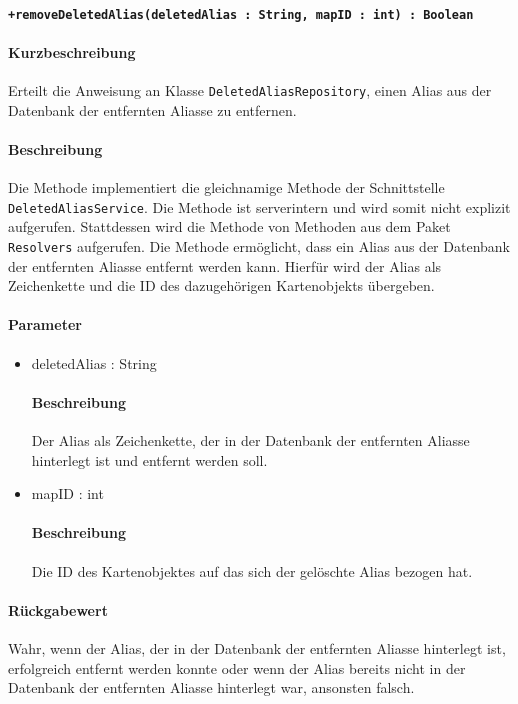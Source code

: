 \paragraph*{\texttt{+removeDeletedAlias(deletedAlias : String, mapID : int) : Boolean}}%
\paragraph*{Kurzbeschreibung}
Erteilt die Anweisung an Klasse \texttt{DeletedAliasRepository}, einen Alias aus der Datenbank der entfernten Aliasse zu entfernen.
\paragraph*{Beschreibung}
Die Methode implementiert die gleichnamige Methode der Schnittstelle \texttt{DeletedAliasService}.
Die Methode ist serverintern und wird somit nicht explizit aufgerufen.
Stattdessen wird die Methode von Methoden aus dem Paket \texttt{Resolvers} aufgerufen.
Die Methode ermöglicht, dass ein Alias aus der Datenbank der entfernten Aliasse entfernt werden kann.
Hierfür wird der Alias als Zeichenkette und die ID des dazugehörigen Kartenobjekts übergeben.
\paragraph*{Parameter}
\begin{itemize}
    \item deletedAlias : String
    		\paragraph*{Beschreibung}
    		Der Alias als Zeichenkette, der in der Datenbank der entfernten Aliasse hinterlegt ist und entfernt werden soll.
	\item mapID : int
			\paragraph*{Beschreibung}
			Die ID des Kartenobjektes auf das sich der gelöschte Alias bezogen hat.		
\end{itemize}
\paragraph*{Rückgabewert}
Wahr, wenn der Alias, der in der Datenbank der entfernten Aliasse hinterlegt ist, erfolgreich entfernt werden konnte oder wenn der Alias bereits nicht in der Datenbank der entfernten Aliasse hinterlegt war, ansonsten falsch.
